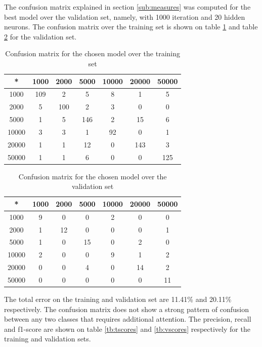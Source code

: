 \documentclass{IEEEtran}
\begin{document}

The confusion matrix explained in section \ref{sub:measures} was computed for the best model over the validation
set, namely, with 1000 iteration and 20 hidden neurons. The confusion matrix over the training set is shown on table
\ref{tb:tconfm} and table \ref{tb:vconfm} for the validation set.

\begin{table}
\centering
\begin{tabular}{|c|c|c|c|c|c|c|}
\hline
* & 1000 & 2000 & 5000 & 10000 & 20000 & 50000 \\
\hline
1000 &  109 & 2 & 5 & 8 & 1 & 5 \\
2000 & 5 & 100 & 2 & 3 & 0 & 0 \\
5000 & 1 & 5 & 146 & 2 &  15 & 6 \\
10000 & 3 & 3 & 1 &  92 & 0 & 1 \\
20000 & 1 & 1 &  12 & 0 & 143 & 3 \\
50000 & 1 & 1 & 6 & 0 & 0 & 125 \\
\hline
\end{tabular}
\caption{Confusion matrix for the chosen model over the training set}
\label{tb:tconfm}
\end{table}

\begin{table}
\centering
\begin{tabular}{|c|c|c|c|c|c|c|}
\hline
* & 1000 & 2000 & 5000 & 10000 & 20000 & 50000 \\
\hline
1000 &  9 &  0 &  0 &  2 &  0 &  0 \\
2000 &  1 & 12 &  0 &  0 &  0 &  1 \\
5000 &  1 &  0 & 15 &  0 &  2 &  0 \\
10000 &  2 &  0 &  0 &  9 &  1 &  2 \\
20000 &  0 &  0 &  4 &  0 & 14 &  2 \\
50000 &  0 &  0 &  0 &  0 &  0 & 11 \\
\hline
\end{tabular}
\caption{Confusion matrix for the chosen model over the validation set}
\label{tb:vconfm}
\end{table}

The total error on the training and validation set are 11.41\% and 20.11\% respectively. The confusion matrix
does not show a strong pattern of confusion between any two classes that requires additional attention.
The precision, recall and f1-score are shown on table \ref{tb:tscores} and \ref{tb:vscores} respectively
for the training and validation sets.
\end{document}
